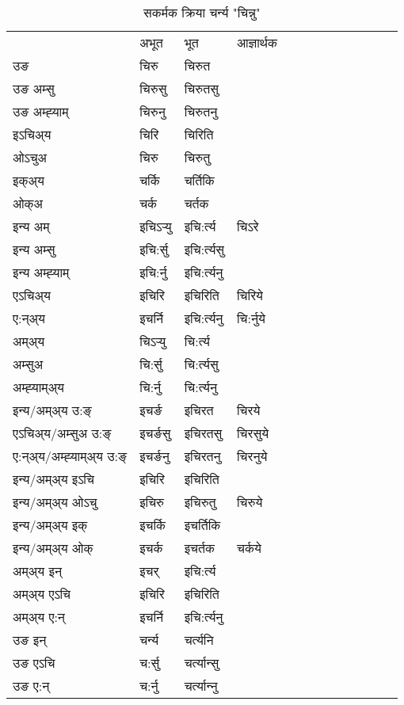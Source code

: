 \begin{table}[H]
\centering
\caption{\label{ir.vt} सकर्मक क्रिया  चर्न्य  "चिन्नु"  }
\begin{tabular}{l|l|l|l|l|l|l|l|l|l|l|l|l}  \toprule
&अभूत & भूत & आज्ञार्थक \\ 
उङ &चिरु &चिरुत \\ 
उङ अम्सु &चिरुसु &चिरुतसु \\ 
उङ अम्ह्‍याम् &चिरुनु &चिरुतनु \\ 
इऽचिअ्य &चिरि &चिरिति   \\ 
ओऽचुअ &चिरु &चिरुतु   \\ 
इक्अ्य &चर्कि &चर्तिकि   \\ 
ओक्अ &चर्क &चर्तक   \\ 
इन्य अम् & इचिऽर्‍यु  & इचि:र्त्य &चिऽरे  \\ 
इन्य अम्सु & इचि:र्सु  & इचि:र्त्यसु   \\ 
इन्य अम्ह्‍याम् & इचि:र्नु  & इचि:र्त्यनु   \\ 
एऽचिअ्य & इचिरि & इचिरिति &चिरिये    \\ 
ए:न्अ्य & इचर्नि  & इचि:र्त्यनु &चि:र्नुये  \\ 
अम्अ्य & चिऽर्‍यु  & चि:र्त्य  \\ 
अम्सुअ & चि:र्सु & चि:र्त्यसु  \\ 
अम्ह्‍याम्अ्य & चि:र्नु  & चि:र्त्यनु \\ 
\midrule
इन्य/अम्अ्य उ:ङ्‌&इचर्ङ & इचिरत &चिरये \\ 
एऽचिअ्य/अम्सुअ उ:ङ्‌ &इचर्ङसु & इचिरतसु &चिरसुये \\ 
ए:न्अ्य/अम्ह्‍याम्अ्य उ:ङ्‌ &इचर्ङनु & इचिरतनु &चिरनुये \\ 
इन्य/अम्अ्य इऽचि & इचिरि & इचिरिति    \\ 
इन्य/अम्अ्य ओऽचु & इचिरु & इचिरुतु  &चिरुये  \\ 
इन्य/अम्अ्य इक् & इचर्कि & इचर्तिकि   \\ 
इन्य/अम्अ्य ओक् & इचर्क & इचर्तक  &चर्कये  \\ 
अम्अ्य इन् & इचर् & इचि:र्त्य   \\ 
अम्अ्य एऽचि & इचिरि & इचिरिति    \\ 
अम्अ्य ए:न् & इचर्नि  & इचि:र्त्यनु  \\ 
\midrule
उङ इन् & चर्न्य  & चर्त्यनि  \\ 
उङ एऽचि & च:र्सु  & चर्त्यान्सु   \\ 
उङ ए:न्& च:र्नु  & चर्त्यान्‍नु   \\ 
\bottomrule
\end{tabular}
\end{table}


